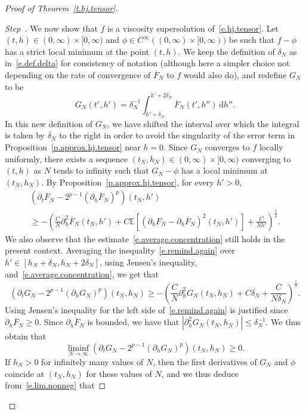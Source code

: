 \documentclass[AHL,Unicode,longabstracts,published]{cedram}
\newcommand{\E}{\mathbb{E}}
\renewcommand{\d}{\mathrm{d}}
\newcommand{\1}{\mathds{1}}
\renewcommand{\le}{\leqslant}
\renewcommand{\ge}{\geqslant}
\renewcommand{\bar}{\overline}
\newcommand{\de}{\delta}
\newcounter{stepcount}
\newenvironment{step}{\refstepcounter{stepcount}\begin{proof}[Step~\thestepcount]}{\let\qed\relax\end{proof}}
\begin{document}
\begin{proof}[Proof of Theorem~\ref{t.hj.tensor}]
\label{prooftheo5.1Step2}
\begin{step}
We now show that $f$ is a viscosity supersolution of~\eqref{e.hj.tensor}. Let $(t,h) \in (0,\infty)\times [0,\infty)$ and $\phi \in C^\infty((0,\infty)\times [0,\infty))$ be such that $f-\phi$ has a strict local minimum at the point $(t,h)$. We keep the definition of $\de_N$ as in~\eqref{e.def.delta} for consistency of notation (although here a simpler choice not depending on the rate of convergence of $\bar F_N$ to $f$ would also do), and redefine $G_N$ to be
\[
G_N\left(t',h'\right) = \de_N^{-1} \int_{h'+\de_N}^{h'+2\de_N} \bar F_N\left(t',h''\right) \, \d h''.
\]
In this new definition of $G_N$, we have shifted the interval over which the integral is taken by $\de_N$ to the right in order to avoid the singularity of the error term in Proposition~\ref{p.approx.hj.tensor} near $h = 0$. Since $G_N$ converges to $f$ locally uniformly, there exists a sequence $(t_N,h_N) \in (0,\infty)\times [0,\infty)$ converging to $(t,h)$ as $N$ tends to infinity such that $G_N - \phi$ has a local minimum at $(t_N,h_N)$. By Proposition~\ref{p.approx.hj.tensor}, for every $h' > 0$,
\begin{multline}\label{e.remind.again}
\left(\partial_t \bar F_N - 2^{p-1} \left(\partial_h \bar F_N\right)^p \right)(t_N,h')
\\
\ge -\left(\frac C {N} \partial_{h}^2 \bar F_N\left(t_N,h'\right) + C \E \left[\left(\partial_h F_N - \partial_h \bar F_N\right)^2\left(t_N,h'\right) \right] +\frac{C}{Nh'}\right)^\frac 1 2.
\end{multline}
We also observe that the estimate~\eqref{e.average.concentration} still holds in the present context. Averaging the inequality~\eqref{e.remind.again} over $h' \in [h_N + \de_N,h_N + 2\de_N]$, using Jensen's inequality, and~\eqref{e.average.concentration}, we get that
\[
\left(\partial_t G_N - 2^{p-1} \left(\partial_h G_N\right)^p \right)(t_N,h_N)
\ge -\left(\frac C {N} \partial_{h}^2 G_N(t_N,h_N) + C \de_N +\frac{C}{N\de_N}\right)^\frac 1 2.
\]
Using Jensen's inequality for the left side of~\eqref{e.remind.again} is justified since $\partial_h \bar F_N \ge 0$. Since $\partial_h \bar F_N$ is bounded, we have that $\left|\partial_h^2 G_N(t_N,h_N)\right| \le \de_N^{-1}$. We thus obtain that
\begin{equation}\label{e.lim.nonneg}
\liminf_{N\to \infty} \left(\partial_t G_N - 2^{p-1} (\partial_h G_N)^p \right)(t_N,h_N) \ge 0.
\end{equation}
If $h_N > 0$ for infinitely many values of $N$, then the first derivatives of $G_N$ and $\phi$ coincide at $(t_N,h_N)$ for these values of $N$, and we thus deduce from~\eqref{e.lim.nonneg} that

\end{step}
\end{proof}
\end{document}
